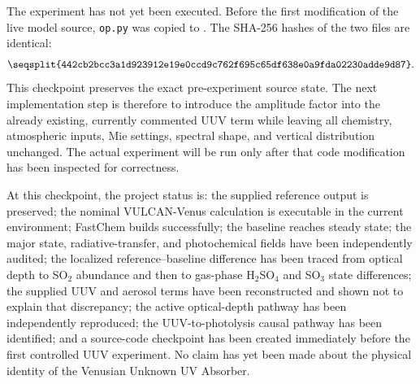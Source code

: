 \documentclass[10pt]{article}
\newcommand{\filepath}[1]{\path{#1}}
\newcommand{\hashval}[1]{\texttt{\seqsplit{#1}}}
\begin{document}
The experiment has not yet been executed. Before the first modification of the live model source, \texttt{op.py} was copied to \filepath{op-25m0328-pre-UUV-experiment.py}. The SHA-256 hashes of the two files are identical:
\[
\hashval{442cb2bcc3a1d923912e19e0ccd9c762f695c65df638e0a9fda02230adde9d87}.
\]
This checkpoint preserves the exact pre-experiment source state. The next implementation step is therefore to introduce the amplitude factor into the already existing, currently commented UUV term while leaving all chemistry, atmospheric inputs, Mie settings, spectral shape, and vertical distribution unchanged. The actual experiment will be run only after that code modification has been inspected for correctness.

At this checkpoint, the project status is: the supplied reference output is preserved; the nominal VULCAN-Venus calculation is executable in the current environment; FastChem builds successfully; the baseline reaches steady state; the major state, radiative-transfer, and photochemical fields have been independently audited; the localized reference--baseline difference has been traced from optical depth to SO$_2$ abundance and then to gas-phase H$_2$SO$_4$ and SO$_3$ state differences; the supplied UUV and aerosol terms have been reconstructed and shown not to explain that discrepancy; the active optical-depth pathway has been independently reproduced; the UUV-to-photolysis causal pathway has been identified; and a source-code checkpoint has been created immediately before the first controlled UUV experiment. No claim has yet been made about the physical identity of the Venusian Unknown UV Absorber.
\end{document}
